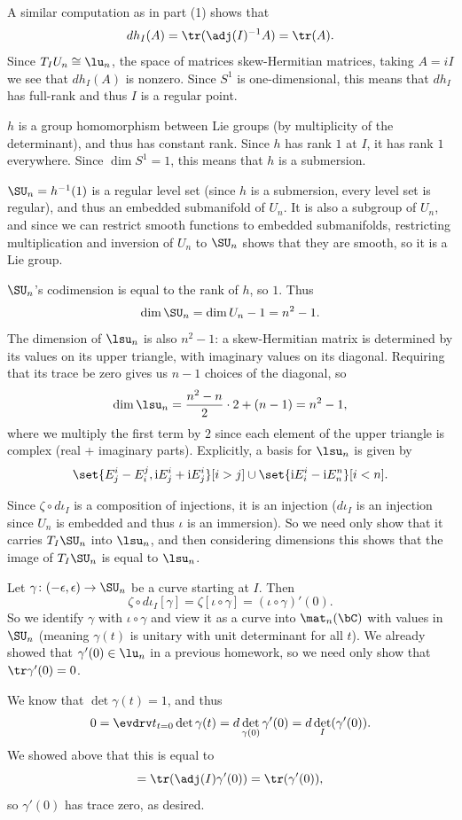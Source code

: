     A similar computation as in part (1) shows that
    $$ dh_I(A) = \tr(\adj(I)^{-1}A) = \tr(A) . $$
    Since $T_IU_n\cong\lu_n$, the space of matrices skew-Hermitian matrices, taking $A=iI$ we see that $dh_I(A)$ is nonzero.
    Since $S^1$ is one-dimensional, this means that $dh_I$ has full-rank and thus $I$ is a regular point.

    \item $h$ is a group homomorphism between Lie groups (by multiplicity of the determinant), and thus has constant rank.
    Since $h$ has rank $1$ at $I$, it has rank $1$ everywhere.
    Since $\dim S^1=1$, this means that $h$ is a submersion.

    \item $\SU_n=h^{-1}(1)$ is a regular level set (since $h$ is a submersion, every level set is regular), and thus an embedded submanifold
    of $U_n$.
    It is also a subgroup of $U_n$, and since we can restrict smooth functions to embedded submanifolds, restricting multiplication and inversion
    of $U_n$ to $\SU_n$ shows that they are smooth, so it is a Lie group.

    \item $\SU_n$'s codimension is equal to the rank of $h$, so $1$.
    Thus
    $$ \dim\SU_n = \dim U_n - 1 = n^2 - 1. $$
    The dimension of $\lsu_n$ is also $n^2-1$: a skew-Hermitian matrix is determined by its values on its upper triangle, with imaginary values
    on its diagonal.
    Requiring that its trace be zero gives us $n-1$ choices of the diagonal, so
    $$ \dim\lsu_n = \frac{n^2-n}2 \cdot 2 + (n-1) = n^2-1 , $$
    where we multiply the first term by $2$ since each element of the upper triangle is complex (real + imaginary parts).
    Explicitly, a basis for $\lsu_n$ is given by
    $$ \set{E^i_j - E^j_i, \i E^i_j + \i E^i_j}[i>j] \cup \set{\i E^i_i - \i E^n_n}[i<n] . $$

    Since $\zeta\circ d\iota_I$ is a composition of injections, it is an injection ($d\iota_I$ is an injection since $U_n$ is embedded
    and thus $\iota$ is an immersion).
    So we need only show that it carries $T_I\SU_n$ into $\lsu_n$, and then considering dimensions this shows that the image of
    $T_I\SU_n$ is equal to $\lsu_n$.

    Let $\gamma\colon(-\epsilon,\epsilon)\to\SU_n$ be a curve starting at $I$.
    Then
    $$ \zeta\circ d\iota_I[\gamma] = \zeta[\iota\circ\gamma] = (\iota\circ\gamma)'(0) . $$
    So we identify $\gamma$ with $\iota\circ\gamma$ and view it as a curve into $\mat_n(\bC)$ with values in $\SU_n$ (meaning $\gamma(t)$ is
    unitary with unit determinant for all $t$).
    We already showed that $\gamma'(0)\in\lu_n$ in a previous homework, so we need only show that $\tr\gamma'(0)=0$.

    We know that $\det\gamma(t)=1$, and thus
    $$ 0 = \evdrv t_{t=0}\det\gamma(t) = d\det_{\gamma(0)}\gamma'(0) = d\det_I(\gamma'(0)) . $$
    We showed above that this is equal to
    $$ = \tr(\adj(I)\gamma'(0)) = \tr(\gamma'(0)) , $$
    so $\gamma'(0)$ has trace zero, as desired.

\eenum



